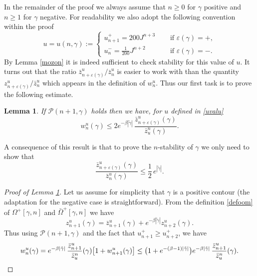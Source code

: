 \documentclass[JEP,XML,SOM,Unicode, NoFloatCountersInSection]{cedram}
\let\mathcal\mathscr
\numberwithin{equation}{section}
\theoremstyle{plain}
\newtheorem{lemma}[theorem]{Lemma}
\theoremstyle{definition}
\newcommand{\cP}{{\ensuremath{\mathcal P}} }
\newcommand{\gb}{\beta}
\newcommand{\gep}{\varepsilon}
\newcommand{\gO}{\Omega}
\begin{document}
In the remainder of the proof we always assume that $n\ge 0$ for $\gamma$ positive and $n\ge 1$ for $\gamma$ negative.
For readability we also adopt the following convention within the proof%
\begin{equation}\label{uvalu}
u=u(n,\gamma):=\begin{cases}
u^+_{n+1}=200 J^{n+3} \quad & \text{ if } \gep(\gamma)=+,\\
u^-_{n}=\frac{1}{200} J^{n+2} \quad & \text{ if } \gep(\gamma)=-.
\end{cases}
\end{equation}
By Lemma \ref{mozon} it is indeed sufficient to check stability for this value of $u$.
It turns out that the ratio $\bar z^{u}_{n+\gep(\gamma)}/\bar z^{u}_n$ is easier to work with than the quantity $z^{u}_{n+\gep(\gamma)}/\bar z^{u}_n$ which appears in the definition of $w^u_n$.
Thus our first task is to prove the following estimate.

\begin{lemma}\label{reduc}
If $\cP(n+1,\gamma)$ holds then we have, for $u$ defined in \eqref{uvalu}
\begin{equation*}
w^u_n(\gamma)\le 2e^{-\gb |\tilde \gamma|}\,\frac{\bar z^{u}_{n+\gep(\gamma)}(\gamma)}{\bar z^n_u(\gamma)}.
\end{equation*}
\end{lemma}
A consequence of this result is that to prove the $n$-stability of $\gamma$ we only need to show that
\begin{equation}\label{core}
\frac{\bar z^{u}_{n+\gep(\gamma)}(\gamma)}{\bar z^{u}_n(\gamma)}\le \frac{1}{2}\,e^{|\tilde \gamma|}.
\end{equation}

\begin{proof}[Proof of Lemma \ref{reduc}]
Let us assume for simplicity that $\gamma$ is a positive contour (the adaptation for the negative case is straightforward).
From the definition \eqref{defoom} of $\gO^+[\gamma,n]$ and $\bar \gO^+[\gamma,n]$ we have
\[
z^u_{n+1}(\gamma)=\bar z^u_{n+1}(\gamma)+e^{-\gb |\tilde \gamma|} z^u_{n+2}(\gamma).
\]
Thus using $\cP(n+1,\gamma)$ and the fact that $u_{n+1}^+\ge u^+_{n+2}$, we have
\begin{equation*}
w^u_n(\gamma)=e^{-\gb |\tilde \gamma|}\, \frac{\bar z^{u}_{n+1}}{\bar z^n_u}(\gamma) \bigl[ 1+ w^u_{n+1}(\gamma)\bigr]
\le \bigl(1+e^{-(\gb-1)|\tilde \gamma|}\bigr)e^{-\gb |\tilde \gamma|}\,\frac{\bar z^{u}_{n+1}}{\bar z^n_u}(\gamma).\qedhere
\end{equation*}
\end{proof}
\end{document}
